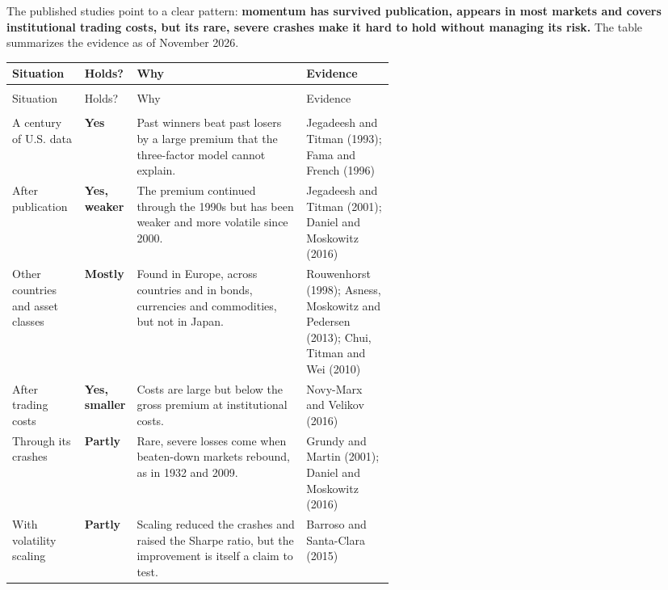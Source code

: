 The published studies point to a clear pattern: \textbf{momentum has survived publication, appears in most markets and covers institutional trading costs, but its rare, severe crashes make it hard to hold without managing its risk.} The table summarizes the evidence as of November 2026.

\begingroup
\small
\setlength{\LTpre}{6pt}\setlength{\LTpost}{6pt}
\begin{longtable}{@{}>{\raggedright\arraybackslash}p{0.19\linewidth}>{\raggedright\arraybackslash}p{0.13\linewidth}>{\raggedright\arraybackslash}p{}>{\raggedright\arraybackslash}p{0.23\linewidth}@{}}
\toprule
Situation & Holds? & Why & Evidence \\
\midrule
\endfirsthead
\multicolumn{4}{@{}l}{\emph{(continued)}} \\
\toprule
Situation & Holds? & Why & Evidence \\
\midrule
\endhead
\midrule
\multicolumn{4}{r@{}}{\emph{(continued on the next page)}} \\
\endfoot
\bottomrule
\endlastfoot
A century of U.S. data & \textbf{Yes} & Past winners beat past losers by a large premium that the three-factor model cannot explain. & Jegadeesh and Titman (1993); Fama and French (1996) \\*
\addlinespace[3pt]
After publication & \textbf{Yes, weaker} & The premium continued through the 1990s but has been weaker and more volatile since 2000. & Jegadeesh and Titman (2001); Daniel and Moskowitz (2016) \\
\addlinespace[3pt]
Other countries and asset classes & \textbf{Mostly} & Found in Europe, across countries and in bonds, currencies and commodities, but not in Japan. & Rouwenhorst (1998); Asness, Moskowitz and Pedersen (2013); Chui, Titman and Wei (2010) \\
\addlinespace[3pt]
After trading costs & \textbf{Yes, smaller} & Costs are large but below the gross premium at institutional costs. & Novy-Marx and Velikov (2016) \\
\addlinespace[3pt]
Through its crashes & \textbf{Partly} & Rare, severe losses come when beaten-down markets rebound, as in 1932 and 2009. & Grundy and Martin (2001); Daniel and Moskowitz (2016) \\*
\addlinespace[3pt]
With volatility scaling & \textbf{Partly} & Scaling reduced the crashes and raised the Sharpe ratio, but the improvement is itself a claim to test. & Barroso and Santa-Clara (2015) \\
\end{longtable}
\addtocounter{table}{-1}%
\endgroup

